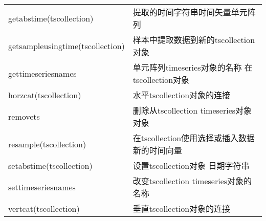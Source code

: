 \begin{longtable}{|l|l|}
            getabstime(tscollection) & 提取的时间字符串时间矢量单元阵列\\
            getsampleusingtime(tscollection) & 样本中提取数据到新的tscollection对象\\
            gettimeseriesnames & 单元阵列timeseries对象的名称 在tscollection对象\\
            horzcat(tscollection) &  水平tscollection对象的连接\\
            removets & 删除从tscollection timeseries对象对象\\
            resample(tscollection) & 在tscollection使用选择或插入数据 新的时间向量\\
            setabstime(tscollection)  &设置tscollection对象 日期字符串\\
            settimeseriesnames & 改变tscollection timeseries对象的名称\\
            vertcat(tscollection)  & 垂直tscollection对象的连接\\
            \hline
            \end{longtable}

